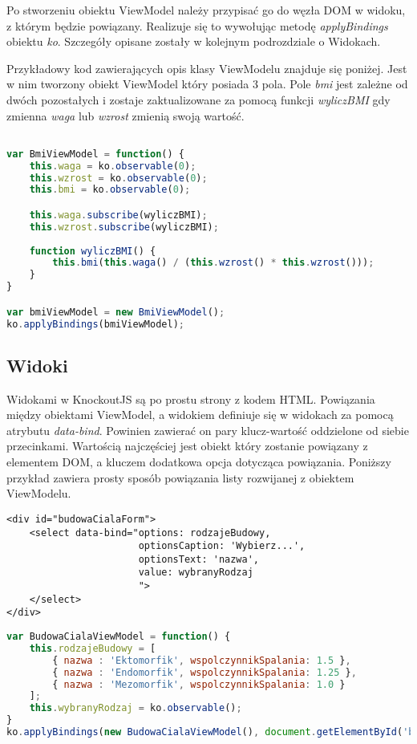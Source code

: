 Po stworzeniu obiektu ViewModel należy przypisać go do węzła DOM w widoku, z którym będzie powiązany. Realizuje się to wywołując metodę \textit{applyBindings} obiektu \textit{ko}. Szczegóły opisane zostały w kolejnym podrozdziale o Widokach.

Przykładowy kod zawierających opis klasy ViewModelu znajduje się poniżej. Jest w nim tworzony obiekt ViewModel który posiada 3 pola. Pole \textit{bmi} jest zależne od dwóch pozostałych i zostaje zaktualizowane za pomocą funkcji \textit{wyliczBMI} gdy zmienna  \textit{waga} lub \textit{wzrost} zmienią swoją wartość.

\begin{lstlisting}[language=JavaScript]

var BmiViewModel = function() {
	this.waga = ko.observable(0);
	this.wzrost = ko.observable(0);
	this.bmi = ko.observable(0);

    this.waga.subscribe(wyliczBMI);
    this.wzrost.subscribe(wyliczBMI);
	
	function wyliczBMI() {
		this.bmi(this.waga() / (this.wzrost() * this.wzrost()));
	}
}

var bmiViewModel = new BmiViewModel();
ko.applyBindings(bmiViewModel);

\end{lstlisting}


\subsection{Widoki}
Widokami w KnockoutJS są po prostu strony z kodem HTML. Powiązania między obiektami ViewModel, a widokiem definiuje się w widokach za pomocą atrybutu \textit{data-bind}. Powinien zawierać on pary klucz-wartość oddzielone od siebie przecinkami. Wartością najczęściej jest obiekt który zostanie powiązany z elementem DOM, a kluczem dodatkowa opcja dotycząca powiązania. Poniższy przykład zawiera prosty sposób powiązania listy rozwijanej z obiektem ViewModelu.

\begin{lstlisting}[language=HTML5]
<div id="budowaCialaForm">
	<select data-bind="options: rodzajeBudowy,
					   optionsCaption: 'Wybierz...',
					   optionsText: 'nazwa',
					   value: wybranyRodzaj
					   ">
	</select>
</div>
\end{lstlisting}

\begin{lstlisting}[language=JavaScript]
var BudowaCialaViewModel = function() {
	this.rodzajeBudowy = [
		{ nazwa : 'Ektomorfik', wspolczynnikSpalania: 1.5 },
		{ nazwa : 'Endomorfik', wspolczynnikSpalania: 1.25 },
		{ nazwa : 'Mezomorfik', wspolczynnikSpalania: 1.0 }
	];
    this.wybranyRodzaj = ko.observable();
}
ko.applyBindings(new BudowaCialaViewModel(), document.getElementById('budowaCialaForm'));
\end{lstlisting}


